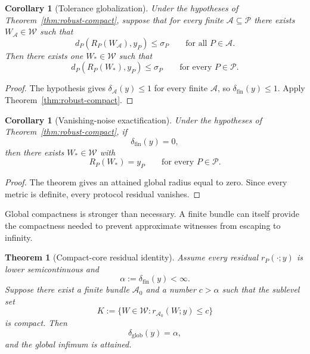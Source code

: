 \documentclass[11pt]{article}
\newtheorem{theorem}[definition]{Theorem}
\newtheorem{corollary}[definition]{Corollary}
\newcommand{\W}{\mathcal W}
\newcommand{\Pcal}{\mathcal P}
\newcommand{\Acal}{\mathcal A}
\begin{document}
\begin{corollary}[Tolerance globalization]
Under the hypotheses of Theorem~\ref{thm:robust-compact}, suppose that for
every finite $\Acal\subseteq\Pcal$ there exists $W_{\Acal}\in\W$ such that
\[
d_P(R_P(W_{\Acal}),y_P)\le\sigma_P
\qquad
\text{for all }P\in\Acal.
\]
Then there exists one $W_\ast\in\W$ such that
\[
d_P(R_P(W_\ast),y_P)\le\sigma_P
\qquad
\text{for every }P\in\Pcal.
\]
\end{corollary}

\begin{proof}
The hypothesis gives $\delta_{\Acal}(y)\le1$ for every finite $\Acal$, so
$\delta_{\mathrm{fin}}(y)\le1$. Apply
Theorem~\ref{thm:robust-compact}.
\end{proof}

\begin{corollary}[Vanishing-noise exactification]
Under the hypotheses of Theorem~\ref{thm:robust-compact}, if
\[
\delta_{\mathrm{fin}}(y)=0,
\]
then there exists $W_\ast\in\W$ with
\[
R_P(W_\ast)=y_P
\qquad
\text{for every }P\in\Pcal.
\]
\end{corollary}

\begin{proof}
The theorem gives an attained global radius equal to zero. Since every metric
is definite, every protocol residual vanishes.
\end{proof}

Global compactness is stronger than necessary. A finite bundle can itself
provide the compactness needed to prevent approximate witnesses from escaping
to infinity.

\begin{theorem}[Compact-core residual identity]
\label{thm:compact-core}
Assume every residual $r_P(\cdot;y)$ is lower semicontinuous and
\[
\alpha:=\delta_{\mathrm{fin}}(y)<\infty.
\]
Suppose there exist a finite bundle $\Acal_0$ and a number $c>\alpha$ such
that the sublevel set
\[
K
:=
\{W\in\W:r_{\Acal_0}(W;y)\le c\}
\]
is compact. Then
\[
\delta_{\mathrm{glob}}(y)=\alpha,
\]
and the global infimum is attained.
\end{theorem}
\end{document}
